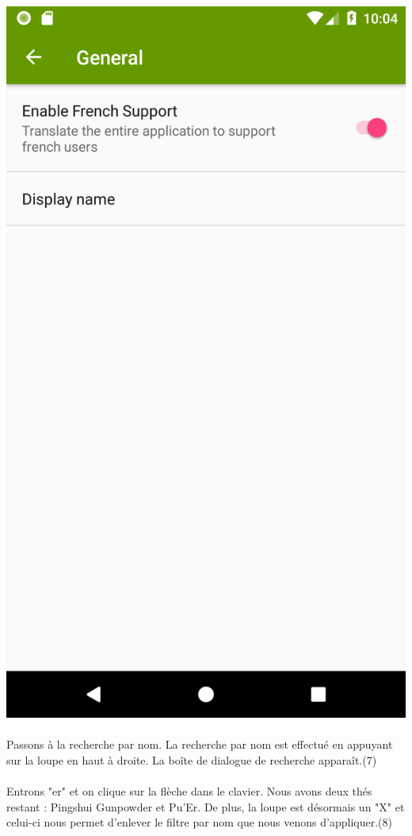 \documentclass[a4paper,12pt]{article}
\begin{document}
\begin{spacing}{1}
	\includegraphics*[scale=0.1]{Screenshot/10.png}\\\\
	Passons à la recherche par nom. La recherche par nom est effectué en appuyant sur la loupe en haut à droite. La boîte de dialogue de recherche apparaît.(7)\\\\
	Entrons "er" et on clique sur la flèche dans le clavier. Nous avons deux thés restant : Pingshui Gunpowder et Pu'Er. De plus, la loupe est désormais un "X" et celui-ci nous permet d'enlever le filtre par nom que nous venons d'appliquer.(8)\\\\

\end{spacing}
\end{document}
